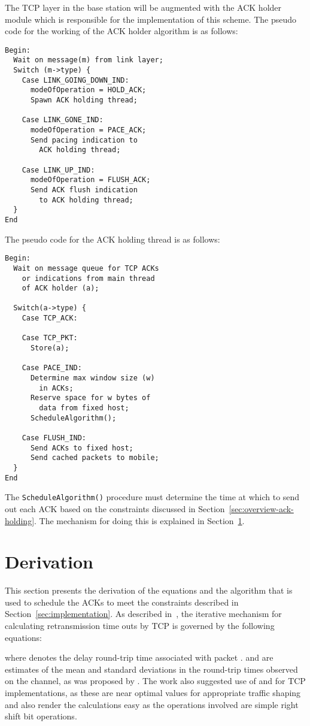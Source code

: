 \documentclass[conference]{IEEEtran}
\begin{document}
The TCP layer in the base station will be augmented with the ACK holder module which is responsible for the implementation of this scheme. The pseudo code for the working of the ACK holder algorithm is as follows:

\begin{verbatim}
Begin:
  Wait on message(m) from link layer;
  Switch (m->type) {
    Case LINK_GOING_DOWN_IND:
      modeOfOperation = HOLD_ACK;
      Spawn ACK holding thread;
    
    Case LINK_GONE_IND:
      modeOfOperation = PACE_ACK;
      Send pacing indication to 
        ACK holding thread;
		
    Case LINK_UP_IND:
      modeOfOperation = FLUSH_ACK;
      Send ACK flush indication 
        to ACK holding thread;
  }
End
\end{verbatim}
The pseudo code for the ACK holding thread is as follows:
\begin{verbatim}
Begin:
  Wait on message queue for TCP ACKs
    or indications from main thread 
    of ACK holder (a);

  Switch(a->type) {
    Case TCP_ACK:

    Case TCP_PKT:
      Store(a);
		
    Case PACE_IND:
      Determine max window size (w) 
        in ACKs; 
      Reserve space for w bytes of 
        data from fixed host;
      ScheduleAlgorithm();
		
    Case FLUSH_IND:
      Send ACKs to fixed host;
      Send cached packets to mobile;
  }
End
\end{verbatim}
The \texttt{ScheduleAlgorithm()} procedure must determine the time at which to send out each ACK based on the constraints discussed in Section~\ref{sec:overview-ack-holding}. The mechanism for doing this is explained in Section~\ref{sec:derivation}.

\section{Derivation}
\label{sec:derivation}
This section presents the derivation of the equations and the algorithm that is used to schedule the ACKs to meet the constraints described in Section~\ref{sec:implementation}. As described in~\cite{Stevens1994}, the iterative mechanism for calculating retransmission time outs by TCP is governed by the following equations:

where  denotes the delay round-trip time associated with packet .  and  are estimates of the mean and standard deviations in the round-trip times observed on the channel, as was proposed by \cite{Jacobson1988}. The work also suggested use of  and  for TCP implementations, as these are near optimal values for appropriate traffic shaping and also render the calculations easy as the operations involved are simple right shift bit operations. 
 
\end{document}
